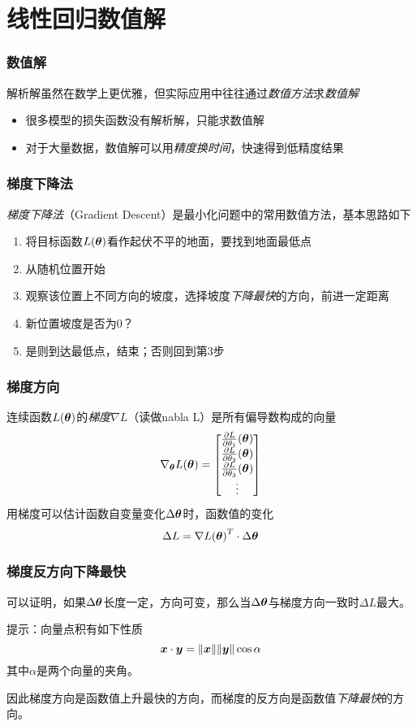 \documentclass[14pt]{beamer}
\begin{document}
\section{线性回归数值解}
\begin{frame}
  \frametitle{数值解}
  解析解虽然在数学上更优雅，但实际应用中往往通过\emph{数值方法}求\emph{数值解}
  \begin{itemize}
    \item 很多模型的损失函数没有解析解，只能求数值解
    \item 对于大量数据，数值解可以用\emph{精度换时间}，快速得到低精度结果
  \end{itemize}
\end{frame}

\begin{frame}
  \frametitle{梯度下降法}
  \emph{梯度下降法}（Gradient Descent）是最小化问题中的常用数值方法，基本思路如下
  \begin{enumerate}
    \item 将目标函数$L(\bm{\theta})$看作起伏不平的地面，要找到地面最低点
    \item 从随机位置开始
    \item 观察该位置上不同方向的坡度，选择坡度\emph{下降最快}的方向，前进一定距离
    \item 新位置坡度是否为$0$？
    \item 是则到达最低点，结束；否则回到第3步
  \end{enumerate}
\end{frame}
  
\begin{frame}
  \frametitle{梯度方向}
  连续函数$L(\bm{\theta})$的\emph{梯度}$\nabla L$（读做nabla L）是所有偏导数构成的向量
  \begin{equation}
    \nabla_{\bm{\theta}} L(\bm{\theta}) = \begin{bmatrix}
      \frac{\partial L}{\partial\theta_1}(\bm{\theta})\\
      \frac{\partial L}{\partial\theta_2}(\bm{\theta})\\
      \frac{\partial L}{\partial\theta_3}(\bm{\theta})\\
      \vdots
    \end{bmatrix}
  \end{equation}
  用梯度可以估计函数自变量变化$\Delta\bm{\theta}$时，函数值的变化
  $$\Delta L ={{\nabla L(\bm{\theta})}^T\cdot\Delta\bm{\theta}}$$
\end{frame}

\begin{frame}
  \frametitle{梯度反方向下降最快}
  可以证明，如果$\Delta\bm{\theta}$长度一定，方向可变，那么当$\Delta\bm{\theta}$与梯度方向一致时$\Delta L$最大。
  
  提示：向量点积有如下性质
  $$\bm{x}\cdot\bm{y}=\|\bm{x}\|\|\bm{y}\|\cos\alpha$$
  其中$\alpha$是两个向量的夹角。

  因此梯度方向是函数值上升最快的方向，而梯度的反方向是函数值\emph{下降最快}的方向。
\end{frame}
\end{document}
